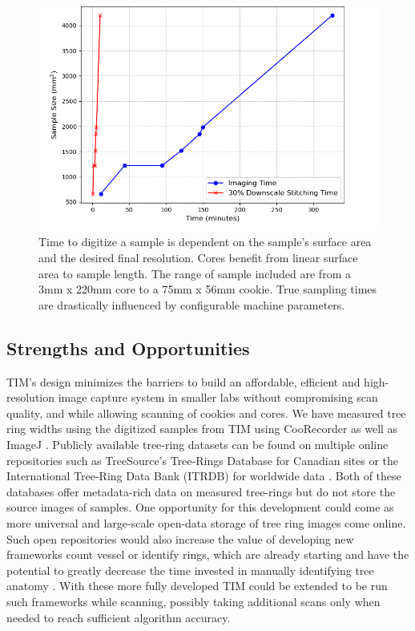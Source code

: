 \documentclass[a4paper,12pt]{article}
\begin{document}
\begin{figure}
    \centering
    \includegraphics[height=0.5\linewidth]{../../code/plots/time_and_area.png}
    \caption{Time to digitize a sample is dependent on the sample's surface area and the desired final resolution.
    Cores benefit from linear surface area to sample length. The range of sample included are from a 3mm x 220mm core to a 75mm x 56mm cookie. True sampling times are drastically influenced by configurable machine parameters.} 
    \label{fig:digitization_time}
\end{figure}

\subsection{Strengths and Opportunities} %
TIM's design minimizes the barriers to build an affordable, efficient and high-resolution image capture system in smaller labs without compromising scan quality, and while allowing scanning of cookies and cores. We have measured tree ring widths using the digitized samples from TIM using CooRecorder as well as ImageJ \citep{schneider_nih_2012}. 
Publicly available tree-ring datasets can be found on multiple online repositories such as TreeSource's Tree-Rings Database for Canadian sites or the International Tree-Ring Data Bank (ITRDB) for worldwide data \citep{girardin_national_2021} \citep{grissino-mayer_international_1997}.
Both of these databases offer metadata-rich data on measured tree-rings but do not store the source images of samples.
One opportunity for this development could come as more universal and large-scale open-data storage of tree ring images come online. 
Such open repositories would also increase the value of developing new frameworks count vessel or identify rings, which are already starting and have the potential to greatly decrease the time invested in manually identifying tree anatomy \citep{resente_mask_2021} \citep{polacek_automation_2023}. 
With these more fully developed TIM could be extended to be run such frameworks while scanning, possibly taking additional scans only when needed to reach sufficient algorithm accuracy. %
\end{document}
